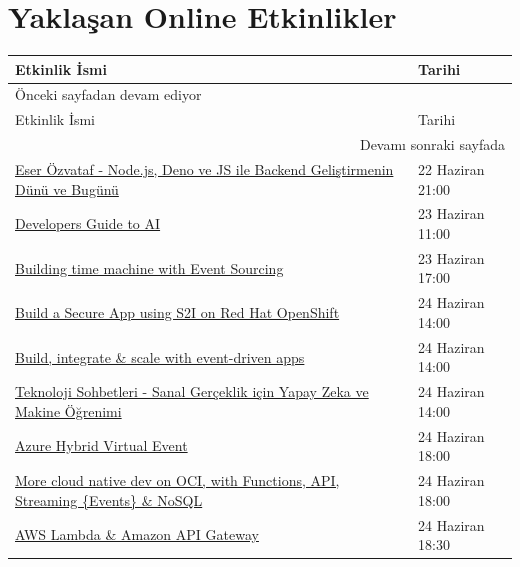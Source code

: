 \documentclass[11pt]{article}
\begin{document}
\section{Yaklaşan Online Etkinlikler}
\label{sec:org350fd03}
\begin{longtable}{|p{9.5cm}|l|}
\hline
Etkinlik İsmi & Tarihi\\
\hline
\endfirsthead
\multicolumn{2}{l}{Önceki sayfadan devam ediyor} \\
\hline

Etkinlik İsmi & Tarihi \\

\hline
\endhead
\hline\multicolumn{2}{r}{Devamı sonraki sayfada} \\
\endfoot
\endlastfoot
\hline
\href{https://kommunity.com/acmhacettepe/events/nodejs-deno-ve-js-ile-backend-gelistirmenin-dunu-ve-bugunu-eser-ozvataf-5ef2730a}{Eser Özvataf - Node.js, Deno ve JS ile Backend Geliştirmenin Dünü ve Bugünü} & 22 Haziran 21:00\\
\href{https://www.meetup.com/tr-TR/Microsoft-Giri\%25C5\%259Fimcilik-Bulu\%25C5\%259Fmalar\%25C4\%25B1/events/270863995/}{Developers Guide to AI} & 23 Haziran 11:00\\
\href{https://www.meetup.com/tr-TR/Microsoft-Giri\%25C5\%259Fimcilik-Bulu\%25C5\%259Fmalar\%25C4\%25B1/events/271151882/}{Building time machine with Event Sourcing} & 23 Haziran 17:00\\
\href{https://www.meetup.com/tr-TR/IBMDeveloperTR/events/270949885/}{Build a Secure App using S2I on Red Hat OpenShift} & 24 Haziran 14:00\\
\href{https://www.meetup.com/tr-TR/Teknolot/events/270951412/}{Build, integrate \& scale with event-driven apps} & 24 Haziran 14:00\\
\href{https://kommunity.com/cozumpark/events/teknoloji-sohbetleri-sanal-gerceklik-icin-yapay-zeka-ve-makine-ogrenimi-3cd4ca45}{Teknoloji Sohbetleri - Sanal Gerçeklik için Yapay Zeka ve Makine Öğrenimi} & 24 Haziran 14:00\\
\href{https://www.meetup.com/tr-TR/Microsoft-Giri\%25C5\%259Fimcilik-Bulu\%25C5\%259Fmalar\%25C4\%25B1/events/271152510/}{Azure Hybrid Virtual Event} & 24 Haziran 18:00\\
\href{https://www.meetup.com/tr-TR/Oracle-Developer-Meetup-Istanbul/events/271395295/}{More cloud native dev on OCI, with Functions, API, Streaming \{Events\} \& NoSQL} & 24 Haziran 18:00\\
\href{https://www.meetup.com/tr-TR/AWS-User-Group-Turkey/events/271307836/}{AWS Lambda \& Amazon API Gateway} & 24 Haziran 18:30\\

\end{longtable}
\end{document}
